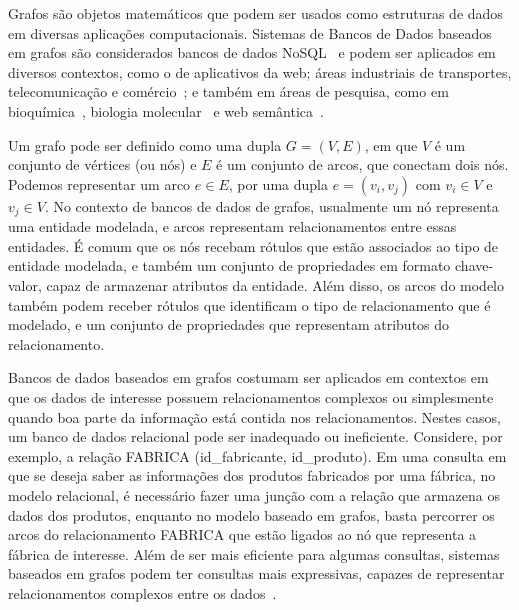 \documentclass[conference]{IEEEtran}
\begin{document}

Grafos são objetos matemáticos que podem ser usados como estruturas de
dados em diversas aplicações computacionais. Sistemas de Bancos de Dados 
baseados em grafos são considerados bancos de dados 
NoSQL~\cite{nosqlorg} e podem ser aplicados em diversos contextos, como 
o de aplicativos da web; áreas industriais de transportes, 
telecomunicação e comércio~\cite{neo4jcustomers}; e também em áreas de 
pesquisa, como em bioquímica~\cite{biochem4j}, biologia 
molecular~\cite{biomol} e web semântica~\cite{sematicweb}.

Um grafo pode ser definido como uma dupla $G = (V, E)$, 
em que $V$ é um conjunto de vértices (ou nós) e $E$ é um conjunto de 
arcos, que conectam dois nós. Podemos representar um arco $e \in E$, 
por uma dupla $e = (v_i, v_j)$ com $v_i \in V$ e $v_j \in V$. No 
contexto de bancos de dados de grafos, usualmente um nó representa 
uma entidade modelada, e arcos representam relacionamentos entre essas 
entidades. É comum que os nós recebam rótulos que estão associados ao 
tipo de entidade modelada, e também um conjunto de propriedades em
formato chave-valor, capaz de armazenar atributos da entidade. Além 
disso, os arcos do modelo também podem receber rótulos que identificam 
o tipo de relacionamento que é modelado, e um conjunto de propriedades
que representam atributos do relacionamento.

Bancos de dados baseados em grafos costumam ser aplicados em contextos
em que os dados de interesse possuem relacionamentos complexos ou 
simplesmente quando boa parte da informação está contida nos 
relacionamentos. Nestes casos, um banco de dados relacional pode ser 
inadequado ou ineficiente. Considere, por exemplo, a relação
{\ttfamily FABRICA (id\_fabricante, id\_produto)}. Em uma consulta em 
que se deseja saber as informações dos produtos fabricados por uma 
fábrica, no modelo relacional, é necessário fazer uma junção com a 
relação que armazena os dados dos produtos, enquanto no modelo baseado 
em grafos, basta percorrer os arcos do relacionamento 
{\ttfamily FABRICA} que estão ligados ao nó que representa a fábrica de 
interesse. Além de ser mais eficiente para algumas consultas, sistemas
baseados em grafos podem ter consultas mais expressivas, capazes de 
representar relacionamentos complexos entre os dados~\cite{neo4jquery}.
\end{document}

